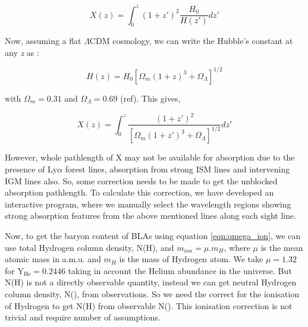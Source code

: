 \begin{equation}
    X(z)=\int_0^z  (1+z')^2 \frac{H_0}{H(z')} dz'
\end{equation}

Now, assuming a flat $\Lambda \text{CDM}$ cosmology, we can write the Hubble's constant at any \emph{z} as :

\begin{equation}
    H(z) = H_0 \left[\Omega_m(1+z)^3+\Omega_\Lambda\right]^{1/2}
\end{equation}

with $\Omega_m=0.31$ and $\Omega_\Lambda=0.69$ (ref). This gives,

\begin{equation}
    X(z)=\int_0^z  \frac{(1+z')^2}{\left[\Omega_m(1+z')^3+\Omega_\Lambda\right]^{1/2}} dz'
\end{equation}

However, whole pathlength of X may not be available for absorption due to the presence of Ly$\alpha$ forest lines, absorption from strong ISM lines and intervening IGM lines also. So, some correction needs to be made to get the unblocked absorption pathlength. To calculate this correction, we have developed an interactive program, where we manually select the wavelength regions showing strong absorption features from the above mentioned lines along each sight line.

Now, to get the baryon content of BLAs using equation \ref{eqn:omega_ion}, we can use total Hydrogen column density, N(H), and $m_{ion}=\mu . m_H$, where $\mu$ is the mean atomic mass in a.m.u. and $m_H$ is the mass of Hydrogen atom. We take $\mu=1.32$ for $\text{Y}_\text{He}=0.2446$ \citep{Peimbert-2016} taking in account the Helium abundance in the universe. But N(H) is not a directly observable quantity, instead we can get neutral Hydrogen column density, N(), from observations. So we need the correct for the ionisation of Hydrogen to get N(H) from observable N(). This ionisation correction is not trivial and require number of assumptions.
 
